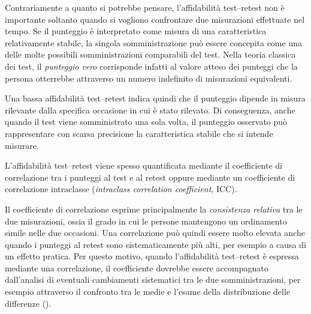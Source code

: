 \documentclass[
  italian,
  letterpaper,
  paper=A4,
  headinclude=on,
  footinclude=on,
  12pt]{scrbook}
\begin{document}
\begin{tcolorbox}[enhanced jigsaw, left=2mm, colbacktitle=quarto-callout-tip-color!10!white, bottomrule=.15mm, opacityback=0, coltitle=black, colframe=quarto-callout-tip-color-frame, opacitybacktitle=0.6, leftrule=.75mm, colback=white, toprule=.15mm, title=\textcolor{quarto-callout-tip-color}{\faLightbulb}\hspace{0.5em}{Rilevanza per una singola misurazione}, titlerule=0mm, arc=.35mm, breakable, rightrule=.15mm, bottomtitle=1mm, toptitle=1mm]

Contrariamente a quanto si potrebbe pensare, l'affidabilità test--retest
non è importante soltanto quando si vogliono confrontare due misurazioni
effettuate nel tempo. Se il punteggio è interpretato come misura di una
caratteristica relativamente stabile, la singola somministrazione può
essere concepita come una delle molte possibili somministrazioni
comparabili del test. Nella teoria classica dei test, il \emph{punteggio
vero} corrisponde infatti al valore atteso dei punteggi che la persona
otterrebbe attraverso un numero indefinito di misurazioni equivalenti.

Una bassa affidabilità test--retest indica quindi che il punteggio
dipende in misura rilevante dalla specifica occasione in cui è stato
rilevato. Di conseguenza, anche quando il test viene somministrato una
sola volta, il punteggio osservato può rappresentare con scarsa
precisione la caratteristica stabile che si intende misurare.

\end{tcolorbox}

L'affidabilità test--retest viene spesso quantificata mediante il
coefficiente di correlazione tra i punteggi al test e al retest oppure
mediante un coefficiente di correlazione intraclasse (\emph{intraclass
correlation coefficient}, ICC).

Il coefficiente di correlazione esprime principalmente la
\emph{consistenza relativa} tra le due misurazioni, ossia il grado in
cui le persone mantengono un ordinamento simile nelle due occasioni. Una
correlazione può quindi essere molto elevata anche quando i punteggi al
retest sono sistematicamente più alti, per esempio a causa di un effetto
pratica. Per questo motivo, quando l'affidabilità test--retest è
espressa mediante una correlazione, il coefficiente dovrebbe essere
accompagnato dall'analisi di eventuali cambiamenti sistematici tra le
due somministrazioni, per esempio attraverso il confronto tra le medie e
l'esame della distribuzione delle differenze (\cite{arcara2016apacs}).
\end{document}
